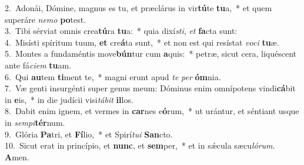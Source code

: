 {2.~}Adonái, Dómine, magnus es tu, et præclárus in vir\textbf{tú}te \textbf{tu}a,~* et quem superáre \textit{ne}\textit{mo} \textbf{po}test.\\
{3.~}Tibi sérviat omnis crea\textbf{tú}ra \textbf{tu}a:~* quia dixí\textit{sti}, \textit{et} \textbf{fa}cta sunt:\\
{4.~}Misísti spíritum tuum, \textbf{et} cre\textbf{á}ta sunt,~* et non est qui resístat \textit{vo}\textit{ci} \textbf{tu}æ.\\
{5.~}Montes a fundaméntis move\textbf{bún}tur cum \textbf{a}quis:~* petræ, sicut cera, liquéscent ante fá\textit{ci}\textit{em} \textbf{tu}am.\\
{6.~}Qui \textbf{au}tem \textbf{ti}ment te,~* magni erunt apud \textit{te} \textit{per} \textbf{óm}nia.\\
{7.~}Væ genti insurgénti super genus meum: Dóminus enim omnípotens vindi\textbf{cá}bit in \textbf{e}is,~* in die judícii visi\textit{tá}\textit{bit} \textbf{il}los.\\
{8.~}Dabit enim ignem, et vermes in \textbf{car}nes e\textbf{ó}rum,~* ut urántur, et séntiant usque in \textit{sem}\textit{pi}\textbf{tér}num.\\
{9.~}Glória \textbf{Pa}tri, et \textbf{Fí}lio,~* et Spirí\textit{tu}\textit{i} \textbf{San}cto.\\
{10.~}Sicut erat in princípio, et \textbf{nunc}, et \textbf{sem}per,~* et in sǽcula sæcu\textit{ló}\textit{rum}. \textbf{A}men.\\
